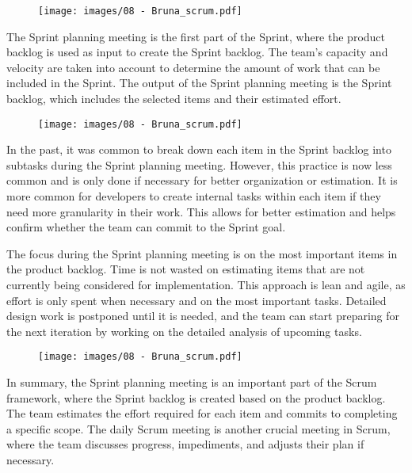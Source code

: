 \begin{figure}[!h]
    \centering
    \texttt{[image: images/08 - Bruna\_scrum.pdf]}
\end{figure}

The Sprint planning meeting is the first part of the Sprint, where the
product backlog is used as input to create the Sprint backlog. The
team's capacity and velocity are taken into account to determine the
amount of work that can be included in the Sprint. The output of the
Sprint planning meeting is the Sprint backlog, which includes the
selected items and their estimated effort.

\begin{figure}[!h]
    \centering
    \texttt{[image: images/08 - Bruna\_scrum.pdf]}
\end{figure}

In the past, it was common to break down each item in the Sprint backlog
into subtasks during the Sprint planning meeting. However, this practice
is now less common and is only done if necessary for better organization
or estimation. It is more common for developers to create internal tasks
within each item if they need more granularity in their work. This
allows for better estimation and helps confirm whether the team can
commit to the Sprint goal.

The focus during the Sprint planning meeting is on the most important
items in the product backlog. Time is not wasted on estimating items
that are not currently being considered for implementation. This
approach is lean and agile, as effort is only spent when necessary and
on the most important tasks. Detailed design work is postponed until it
is needed, and the team can start preparing for the next iteration by
working on the detailed analysis of upcoming tasks.

\begin{figure}[!h]
    \centering
    \texttt{[image: images/08 - Bruna\_scrum.pdf]}
\end{figure}

In summary, the Sprint planning meeting is an important part of the
Scrum framework, where the Sprint backlog is created based on the
product backlog. The team estimates the effort required for each item
and commits to completing a specific scope. The daily Scrum meeting is
another crucial meeting in Scrum, where the team discusses progress,
impediments, and adjusts their plan if necessary.

